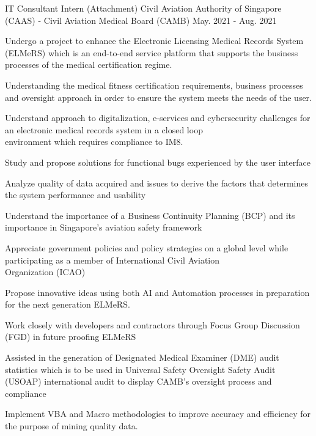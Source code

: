 \begin{cventries}
  \cventry
    {IT Consultant Intern (Attachment)} %
    {Civil Aviation Authority of Singapore (CAAS) - Civil Aviation Medical Board (CAMB)} %
    {May. 2021 - Aug. 2021} %
    {} %
    {
      \begin{cvitems} %
        \item {Undergo a project to enhance the Electronic Licensing Medical Records System (ELMeRS) which is an end-to-end service platform that supports the business processes of the medical certification regime.}
        \item {Understanding the medical fitness certification requirements, business processes and oversight approach in order to ensure the system meets the needs of the user.}
        \item {Understand approach to digitalization, e-services and cybersecurity challenges for an electronic medical records system in a closed loop \\ environment which requires compliance to IM8.}
        \item {Study and propose solutions for functional bugs experienced by the user interface}
        \item {Analyze quality of data acquired and issues to derive the factors that determines the system performance and usability}
        \item {Understand the importance of a Business Continuity Planning (BCP) and its importance in Singapore’s aviation safety framework}
        \item {Appreciate government policies and policy strategies on a global level while participating as a member of International Civil Aviation \\ Organization (ICAO) }
        \item {Propose innovative ideas using both AI and Automation processes in preparation for the next generation ELMeRS.}
        \item {Work closely with developers and contractors through Focus Group Discussion (FGD) in future proofing ELMeRS}
        \item {Assisted in the generation of Designated Medical Examiner (DME) audit statistics which is to be used in Universal Safety Oversight Safety Audit (USOAP) international audit to display CAMB’s oversight process and compliance}
        \item {Implement VBA and Macro methodologies to improve accuracy and efficiency for the purpose of mining quality data. }
      \end{cvitems}
    }


\end{cventries}
